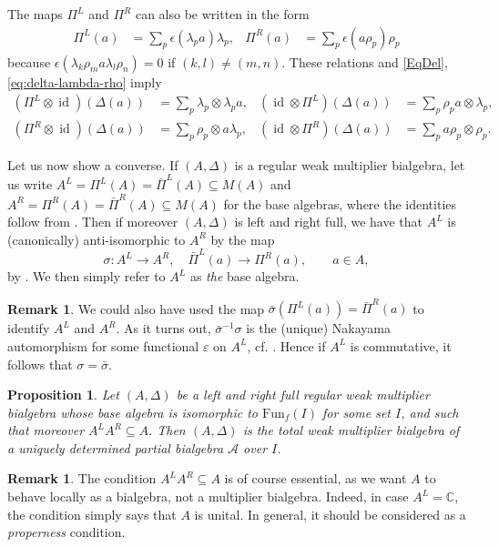 \documentclass[11pt]{article}
\DeclareMathOperator{\id}{id}
\newcommand{\C}{\mathbb{C}}
\newcommand{\Fun}{\mathrm{Fun}}
\newtheorem{Prop}[Theorem]{Proposition}
\theoremstyle{definition}
\newtheorem{Rem}[Theorem]{Remark}
\numberwithin{equation}{section}
\begin{document}
 The maps $\Pi^{L}$ and $\Pi^{R}$ can also
be written in the form
\begin{align} \label{eq:pi} 
    \Pi^L(a) & = \sum_{p}\epsilon(\lambda_{p}a)\lambda_p, & \Pi^R(a) & =    \sum_{p}\epsilon(a \rho_{p}) \rho_p
\end{align}
because $\epsilon(\lambda_{k}\rho_{m} a \lambda_{l}\rho_{n})=0$  if $(k,l)\neq(m,n)$. These relations and  \eqref{EqDel}, \eqref{eq:delta-lambda-rho} imply
\begin{align} \label{eq:pi-l-delta}
  (\Pi^{L} \otimes \id)(\Delta(a)) &= \sum_{p} \lambda_{p}\otimes \lambda_{p}a, &
  (\id \otimes \Pi^{L})(\Delta(a)) &= \sum_{p} \rho_{p}a \otimes \lambda_{p}, & \\ \label{eq:pi-r-delta}
  (\Pi^{R} \otimes \id)(\Delta(a)) &= \sum_{p} \rho_{p} \otimes a\lambda_{p}, &
  (\id \otimes \Pi^{R})(\Delta(a)) &= \sum_{p} a\rho_{p} \otimes \rho_{p}.
\end{align}

Let us now show a converse. If $(A,\Delta)$ is a regular weak multiplier bialgebra, let us write $A^L = \Pi^L(A) = \bar{\Pi}^L(A)\subseteq M(A)$ and $A^R = \Pi^R(A)= \bar{\Pi}^R(A)\subseteq M(A)$ for the base algebras, where the identities follow from \cite[Theorem 3.13]{Boh1}. Then if moreover $(A,\Delta)$ is left and right full, we have that $A^L$ is (canonically) anti-isomorphic to $A^R$ by the map \[\sigma: A^L \rightarrow A^R, \quad \bar{\Pi}^L(a) \rightarrow \Pi^R(a), \qquad a\in A,\] by \cite[Lemma 4.8]{Boh1}. We then simply refer to $A^L$ as \emph{the} base algebra. 

\begin{Rem}\label{RemNak} We could also have used the map $\bar{\sigma}(\Pi^L(a)) = \bar{\Pi}^R(a)$ to identify $A^L$ and $A^R$. As it turns out, $\bar{\sigma}^{-1}\sigma$ is the (unique) Nakayama automorphism for some functional $\varepsilon$ on $A^L$, cf. \cite[Proposition 4.9]{Boh1}. Hence if $A^L$ is commutative, it follows that $\sigma = \bar{\sigma}$.
\end{Rem} 

\begin{Prop}\label{PropCharPBA} Let $(A,\Delta)$ be a left and right full regular weak multiplier bialgebra whose base algebra is isomorphic to $\Fun_f(I)$ for some set $I$, and such that moreover $A^LA^R \subseteq A$. Then $(A,\Delta)$ is the total weak multiplier bialgebra of a uniquely determined partial bialgebra $\mathscr{A}$ over $I$.
\end{Prop} 

\begin{Rem} The condition $A^LA^R \subseteq A$ is of course essential, as we want $A$ to behave locally as a bialgebra, not a multiplier bialgebra. Indeed, in case $A^L= \C$, the condition simply says that $A$ is unital. In general, it should be considered as a \emph{properness} condition. %
\end{Rem} 
\end{document}
